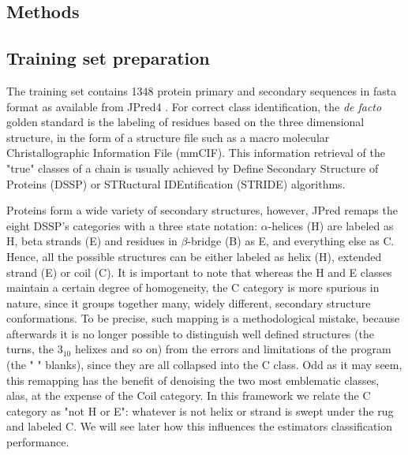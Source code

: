 \documentclass[nocrop]{bioinfo}
\begin{document}
\begin{methods}
\section{Methods}
\subsection{Training set preparation}
The training set contains \num{1348} protein primary and secondary sequences in fasta format as available from JPred4 \citep{Drozdetskiy2015}.
For correct class identification, the \textit{de facto} golden standard is the labeling of residues based on the three dimensional structure, in the form of a structure file such as a macro molecular Christallographic Information File (mmCIF).
This information retrieval of the "true" classes of a chain is usually achieved by Define Secondary Structure of Proteins (DSSP)\citep{Kabsch1983} or STRuctural IDEntification (STRIDE)\citep{frishman1995knowledge} algorithms.

Proteins form a wide variety of secondary structures, however, JPred remaps the eight DSSP's categories with a three state notation: $\alpha$-helices (H) are labeled as H, beta strands (E) and residues in $\beta$-bridge (B) as E, and everything else as C. 
Hence, all the possible structures can be either labeled as helix (H), extended strand (E) or coil (C).
It is important to note that whereas the H and E classes maintain a certain degree of homogeneity, the C category is more spurious in nature, since it groups together many, widely different, secondary structure conformations.
To be precise, such mapping is a methodological mistake, because afterwards it is no longer possible to distinguish well defined structures (the turns, the 3$_{10}$ helixes and so on) from the errors and limitations of the program (the " " blanks), since they are all collapsed into the C class.
Odd as it may seem, this remapping has the benefit of denoising the two most emblematic classes, alas, at the expense of the Coil category.
In this framework we relate the C category as "not H or E": whatever is not helix or strand is swept under the rug and labeled C.
We will see later how this influences the estimators classification performance.
 

\end{methods}
\end{document}
